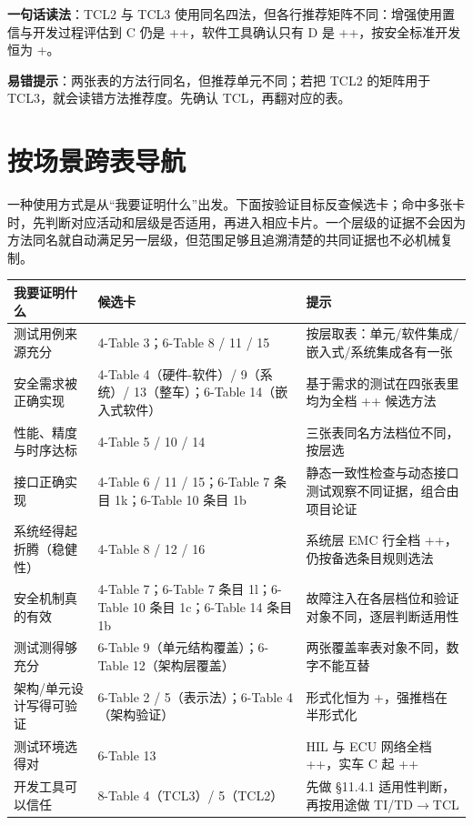 \textbf{一句话读法}：TCL2 与 TCL3 使用同名四法，但各行推荐矩阵不同：增强使用置信与开发过程评估到 C 仍是 ++，软件工具确认只有 D 是 ++，按安全标准开发恒为 +。

\textbf{易错提示}：两张表的方法行同名，但推荐单元不同；若把 TCL2 的矩阵用于 TCL3，就会读错方法推荐度。先确认 TCL，再翻对应的表。

\section{按场景跨表导航}

一种使用方式是从“我要证明什么”出发。下面按验证目标反查候选卡；命中多张卡时，先判断对应活动和层级是否适用，再进入相应卡片。一个层级的证据不会因为方法同名就自动满足另一层级，但范围足够且追溯清楚的共同证据也不必机械复制。

\begingroup\small
\setlength{\tabcolsep}{4pt}
\begin{xltabular}{\linewidth}{@{}XXX@{}}
\toprule
我要证明什么 & 候选卡 & 提示 \\
\midrule
\endhead
测试用例来源充分 & 4-Table 3；6-Table 8 / 11 / 15 & 按层取表：单元/软件集成/嵌入式/系统集成各有一张 \\
安全需求被正确实现 & 4-Table 4（硬件-软件）/ 9（系统）/ 13（整车）；6-Table 14（嵌入式软件） & 基于需求的测试在四张表里均为全档 ++ 候选方法 \\
性能、精度与时序达标 & 4-Table 5 / 10 / 14 & 三张表同名方法档位不同，按层选 \\
接口正确实现 & 4-Table 6 / 11 / 15；6-Table 7 条目 1k；6-Table 10 条目 1b & 静态一致性检查与动态接口测试观察不同证据，组合由项目论证 \\
系统经得起折腾（稳健性） & 4-Table 8 / 12 / 16 & 系统层 EMC 行全档 ++，仍按备选条目规则选法 \\
安全机制真的有效 & 4-Table 7；6-Table 7 条目 1l；6-Table 10 条目 1c；6-Table 14 条目 1b & 故障注入在各层档位和验证对象不同，逐层判断适用性 \\
测试测得够充分 & 6-Table 9（单元结构覆盖）；6-Table 12（架构层覆盖） & 两张覆盖率表对象不同，数字不能互替 \\
架构/单元设计写得可验证 & 6-Table 2 / 5（表示法）；6-Table 4（架构验证） & 形式化恒为 +，强推档在半形式化 \\
测试环境选得对 & 6-Table 13 & HIL 与 ECU 网络全档 ++，实车 C 起 ++ \\
开发工具可以信任 & 8-Table 4（TCL3）/ 5（TCL2） & 先做 §11.4.1 适用性判断，再按用途做 TI/TD\(\rightarrow\)TCL \\
\bottomrule
\end{xltabular}
\endgroup

